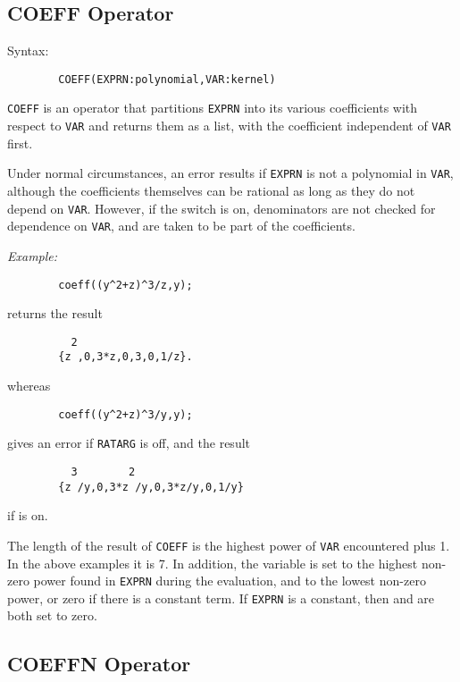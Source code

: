 \subsection{COEFF Operator}
\hypertarget{operator:COEFF}{}
\hypertarget{switch:RATARG}{}
Syntax:
\begin{verbatim}
        COEFF(EXPRN:polynomial,VAR:kernel)
\end{verbatim}
\texttt{COEFF} is an operator that partitions \texttt{EXPRN} into its various
coefficients with respect to \texttt{VAR} and returns them as a list, with
the coefficient independent of \texttt{VAR} first.

Under normal circumstances, an error results if \texttt{EXPRN} is not a
polynomial in \texttt{VAR}, although the coefficients themselves can be
rational as long as they do not depend on \texttt{VAR}.  However, if the
switch  is on, denominators are not checked for
dependence on \texttt{VAR}, and are taken to be part of the coefficients.

\textit{Example:}
\begin{verbatim}
        coeff((y^2+z)^3/z,y);
\end{verbatim}
returns the result
\begin{verbatim}
          2
        {z ,0,3*z,0,3,0,1/z}.
\end{verbatim}
whereas
\begin{verbatim}
        coeff((y^2+z)^3/y,y);
\end{verbatim}
gives an error if \texttt{RATARG} is off, and the result
\begin{verbatim}
          3        2
        {z /y,0,3*z /y,0,3*z/y,0,1/y}
\end{verbatim}
if  is on.

\hypertarget{reserved:HIGH_POW}{}
\hypertarget{reserved:LOW_POW}{}
The length of the result of \texttt{COEFF} is the highest power of \texttt{VAR}
encountered plus 1.  In the above examples it is 7.  In addition, the
variable  is set to the highest non-zero
power found in \texttt{EXPRN} during the evaluation, and 
 to the lowest non-zero power, or zero if there is a
constant term.  If \texttt{EXPRN} is a constant, then  and
 are both set to zero.

\subsection{COEFFN Operator}
\hypertarget{operator:COEFFN}{}

